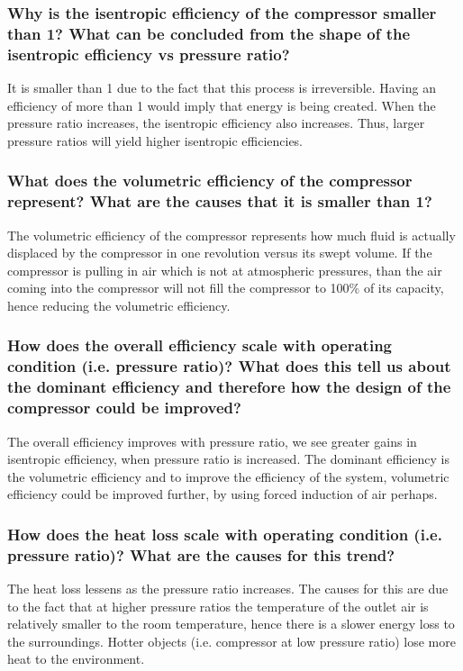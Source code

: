 \documentclass[class=article, crop=false, 12pt,a4paper]{standalone}
\numberwithin{equation}{section}
\begin{document}
\subsubsection{Why is the isentropic efficiency of the compressor smaller than 1? What can be concluded from the shape of the isentropic efficiency vs pressure ratio?}
It is smaller than 1 due to the fact that this process is irreversible. Having an efficiency of more than 1 would imply that energy is being created. When the pressure ratio increases, the isentropic efficiency also increases. Thus, larger pressure ratios will yield higher isentropic efficiencies. 
\subsubsection{What does the volumetric efficiency of the compressor represent? What are the causes that it is smaller than 1?}
The volumetric efficiency of the compressor represents how much fluid is actually displaced by the compressor in one revolution versus its swept volume. If the compressor is pulling in air which is not at atmospheric pressures, than the air coming into the compressor will not fill the compressor to 100\% of its capacity, hence reducing the volumetric efficiency. 
\subsubsection{How does the overall efficiency scale with operating condition (i.e. pressure ratio)? What does this tell us about the dominant efficiency and therefore how the design of the compressor could be improved?} 
The overall efficiency improves with pressure ratio, we see greater gains in isentropic efficiency, when pressure ratio is increased. The dominant efficiency is the volumetric efficiency and to improve the efficiency of the system, volumetric efficiency could be improved further, by using forced induction of air perhaps. 
\subsubsection{How does the heat loss scale with operating condition (i.e. pressure ratio)? What are the causes for this trend?}
The heat loss lessens as the pressure ratio increases. The causes for this are due to the fact that at higher pressure ratios the temperature of the outlet air is relatively smaller to the room temperature, hence there is a slower energy loss to the surroundings. Hotter objects (i.e. compressor at low pressure ratio) lose more heat to the environment. 
\listoffigures
\end{document}
